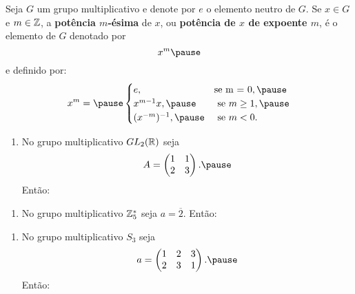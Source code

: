 \documentclass{beamer}
\begin{document}
    \begin{frame}
        Seja $G$ um grupo multiplicativo \pause e denote por $e$ o elemento neutro de $G$. \pause Se $x \in G$ \pause e $m \in \mathbb{Z}$, \pause a \textbf{pot\^encia $m$-ésima} de $x$, \pause ou \textbf{pot\^encia de $x$ de expoente $m$}, \pause é o elemento de $G$ denotado por \pause
        \[
            x^m \pause
        \]
        e definido por: \pause
        \[
            x^m = \pause \begin{cases}
                    e, & \mbox{se m = 0}, \pause\\
                    x^{m-1}x, \pause & \mbox{ se } m \ge 1, \pause\\
                    (x^{-m})^{-1}, \pause & \mbox{ se } m < 0.
                   \end{cases}
        \]

    \end{frame}

    \begin{frame}
        \begin{exemplos}
            \begin{enumerate}[label={\roman*})]
                \item No grupo multiplicativo $GL_2(\mathbb{R})$ \pause seja \pause
                \[
                    A = \begin{pmatrix}
                        1 & 1\\2 & 3
                    \end{pmatrix}. \pause
                \]
                Então:
                \seti
            \end{enumerate}
        \end{exemplos}
    \end{frame}

    \begin{frame}
        \begin{exemplos}
            \begin{enumerate}[label={\roman*})]
                \conti
                \item No grupo multiplicativo $\mathbb{Z}_5^*$ \pause seja $a = \overline{2}$. \pause Então:
                \seti
            \end{enumerate}
        \end{exemplos}
    \end{frame}

    \begin{frame}
        \begin{exemplos}
            \begin{enumerate}[label={\roman*})]
                \conti
                \item No grupo multiplicativo $S_3$ \pause seja
                \[
                    a = \begin{pmatrix}
                        1 & 2 & 3\\ 2 & 3 & 1
                    \end{pmatrix}.\pause
                \]
                Então:
            \end{enumerate}
        \end{exemplos}
    \end{frame}
\end{document}
